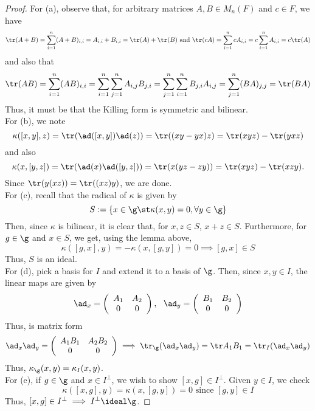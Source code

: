 \documentclass[11pt,leqno,oneside]{amsart}
\numberwithin{thm}{section}
\begin{document}
\begin{proof}
  For (a), observe that, for arbitrary matrices \(A,B \in M_n(F)\) and
  \(c \in F\), we
  have \[
    \tr(A+B) = \sum_{i=1}^n (A+B)_{i,i} = A_{i,i} + B_{i,i} = \tr(A) +
    \tr(B) \text{ and } \tr(cA) = \sum_{i=1}^n cA_{i,i} =
    c\sum_{i=1}^n A_{i,i} = c \tr(A)
  \]
  and also that
  \[
    \tr(AB) = \sum_{i=1}^n (AB)_{i,i} = \sum_{i=1}^n \sum_{j=1}^n A_{i,j} B_{j,i} = \sum_{j=1}^n
    \sum_{i=1}^n B_{j,i} A_{i,j} = \sum_{j=1}^n (BA)_{j,j} = \tr(BA)
  \]
  Thus, it must be that the Killing form is symmetric and bilinear.\\

  For (b), we note  \[
    \kappa([x,y],z) = \tr(\ad([x,y])\ad(z)) = \tr((xy-yx)z) = \tr(xyz)-\tr(yxz)
  \]
  and also \[
    \kappa(x,[y,z]) = \tr(\ad(x)\ad([y,z])) = \tr(x(yz-zy)) =
    \tr(xyz)-\tr(xzy).
  \]
  Since \(\tr(y(xz)) = \tr((xz)y)\), we are done. \\

  For (c), recall that the radical of \(\kappa\) is given by \[
    S := \{x \in \g \st \kappa(x,y) = 0, \forall y \in \g\}
  \]
  Then, since \(\kappa\) is bilinear, it is clear that, for \(x,z \in
  S\), \(x+z \in S\). Furthermore, for \(g \in \g\) and \(x \in S\),
  we get, using the lemma above,
  \[
    \kappa([g,x],y) = -\kappa(x,[g,y]) = 0 \implies [g,x] \in S 
  \]
  Thus, \(S\) is an ideal. \\

  For (d), pick a basis for \(I\) and extend it to a basis of
  \(\g\). Then, since \(x,y \in I\), the linear maps are given by \[
    \ad_x = \left(
      \begin{array}{cc}
        A_1 & A_2 \\
        0 & 0
      \end{array}
\right), \ \ \ad_y = \left(
  \begin{array}{cc}
    B_1&B_2\\
    0&0
  \end{array}
\right)
  \]
  Thus, is matrix form \[
    \ad_x \ad_y = \left(
      \begin{array}{cc}
        A_1 B_1 & A_2 B_2 \\
        0 & 0
      \end{array}
  \right) \implies \tr_\g(\ad_x \ad_y) = \tr A_1 B_1 = \tr_I(\ad_x \ad_y)
  \]
  Thus, \(\kappa_\g(x,y) = \kappa_I(x,y)\). \\ 

  For (e), if \(g \in \g\) and \(x \in I^\perp\), we wish to show
  \([x,g] \in I^\perp\). Given \(y \in I\), we check \[
    \kappa([x,g],y) = \kappa(x,[g,y]) = 0 \text{ since }[g,y] \in I
  \]
  Thus, \([x,g] \in I^\perp \implies I^\perp \ideal \g\).
\end{proof}
\end{document}
